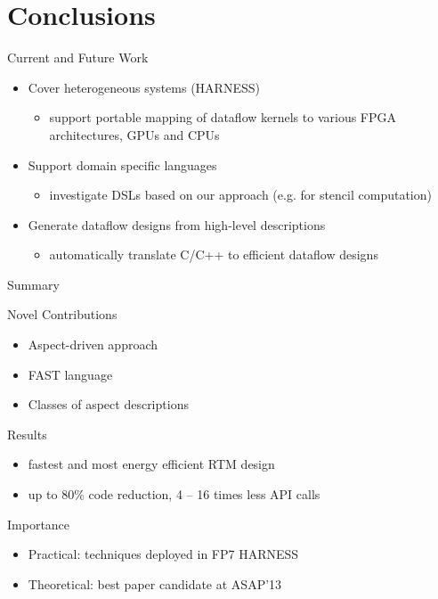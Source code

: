 \section{Conclusions}

\begin{frame}{Current and Future Work}

  \begin{itemize}
    \setlength{\itemsep}{10pt}

  \item Cover heterogeneous systems (HARNESS)
    \begin{itemize}
    \item support portable mapping of dataflow kernels to various FPGA
      architectures, GPUs and CPUs
    \end{itemize}

  \item Support domain specific languages
    \begin{itemize}
    \item investigate DSLs based on our approach (e.g. for stencil
      computation)
    \end{itemize}

  \item Generate dataflow designs from high-level descriptions
    \begin{itemize}
    \item automatically translate C/C++ to efficient dataflow designs
    \end{itemize}

  \end{itemize}
\end{frame}


\begin{frame}{Summary}
  \begin{beamerboxesrounded}{Novel Contributions}
    \begin{itemize}
    \item  Aspect-driven approach
    \item  FAST language
    \item  Classes of aspect descriptions
    \end{itemize}
  \end{beamerboxesrounded}
  \vspace{0.3cm}
  \begin{beamerboxesrounded}{Results}
    \begin{itemize}
    \item fastest and most energy efficient RTM design
    \item up to 80\% code reduction, 4 -- 16 times less API calls
    \end{itemize}
  \end{beamerboxesrounded}
  \vspace{0.3cm}
  \begin{beamerboxesrounded}{Importance}
    \begin{itemize}
    \item Practical: techniques deployed in FP7 HARNESS
    \item Theoretical: best paper candidate at ASAP'13
    \end{itemize}
  \end{beamerboxesrounded}
\end{frame}
